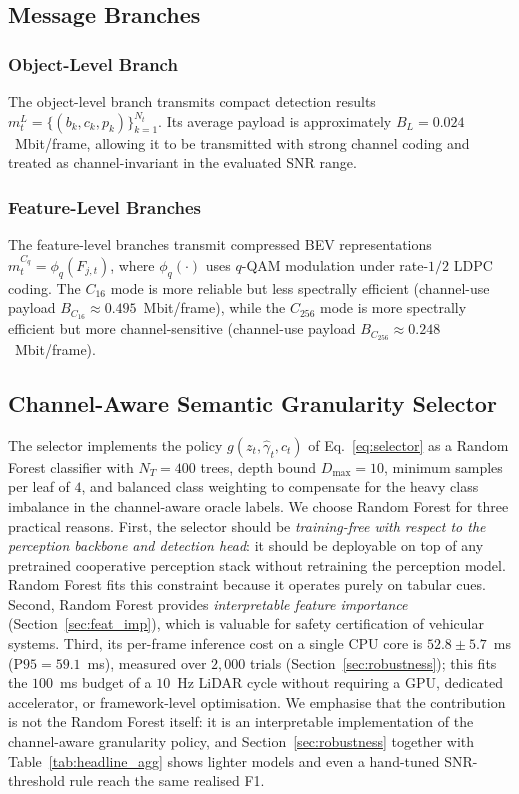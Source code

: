 \documentclass[journal]{IEEEtran}
\begin{document}
\subsection{Message Branches}

\subsubsection{Object-Level Branch}
The object-level branch transmits compact detection results $m_t^L = \{(b_k,c_k,p_k)\}_{k=1}^{N_t}$. Its average payload is approximately $B_L = 0.024$~Mbit/frame, allowing it to be transmitted with strong channel coding and treated as channel-invariant in the evaluated SNR range.

\subsubsection{Feature-Level Branches}
The feature-level branches transmit compressed BEV representations $m_t^{C_q} = \phi_q(F_{j,t})$, where $\phi_q(\cdot)$ uses $q$-QAM modulation under rate-$1/2$ LDPC coding. The $C_{16}$ mode is more reliable but less spectrally efficient (channel-use payload $B_{C_{16}} \approx 0.495$~Mbit/frame), while the $C_{256}$ mode is more spectrally efficient but more channel-sensitive (channel-use payload $B_{C_{256}} \approx 0.248$~Mbit/frame).

\subsection{Channel-Aware Semantic Granularity Selector}

The selector implements the policy $g(z_t,\hat\gamma_t,c_t)$ of Eq.~\eqref{eq:selector} as a Random Forest classifier with $N_T=400$ trees, depth bound $D_{\max}=10$, minimum samples per leaf of $4$, and balanced class weighting to compensate for the heavy class imbalance in the channel-aware oracle labels. We choose Random Forest for three practical reasons. First, the selector should be \emph{training-free with respect to the perception backbone and detection head}: it should be deployable on top of any pretrained cooperative perception stack without retraining the perception model. Random Forest fits this constraint because it operates purely on tabular cues. Second, Random Forest provides \emph{interpretable feature importance} (Section~\ref{sec:feat_imp}), which is valuable for safety certification of vehicular systems. Third, its per-frame inference cost on a single CPU core is $52.8 \pm 5.7$~ms ($\mathrm{P95} = 59.1$~ms), measured over $2{,}000$ trials (Section~\ref{sec:robustness}); this fits the $100$~ms budget of a $10$~Hz LiDAR cycle without requiring a GPU, dedicated accelerator, or framework-level optimisation. We emphasise that the contribution is not the Random Forest itself: it is an interpretable implementation of the channel-aware granularity policy, and Section~\ref{sec:robustness} together with Table~\ref{tab:headline_agg} shows lighter models and even a hand-tuned SNR-threshold rule reach the same realised F1.
\end{document}

